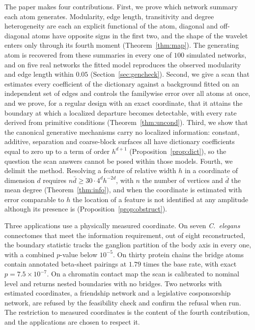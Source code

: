 \documentclass[11pt]{article}
\theoremstyle{definition}
\newcommand{\1}{\mathbf 1}\newcommand{\op}{\operatorname}
\begin{document}
The paper makes four contributions.  First, we prove which network summary
each atom generates.  Modularity, edge length, transitivity and degree
heterogeneity are each an explicit functional of the atom, diagonal and
off-diagonal atoms have opposite signs in the first two, and the shape of the
wavelet enters only through its fourth moment (Theorem~\ref{thm:map}).  The
generating atom is recovered from these summaries in every one of $100$
simulated networks, and on five real networks the fitted model reproduces
the observed modularity and edge length within $0.05$
(Section~\ref{sec:gencheck}).  Second, we give a scan that estimates every coefficient
of the dictionary against a background fitted on an independent set of edges
and controls the familywise error over all atoms at once, and we prove, for a
regular design with an exact coordinate, that it attains the boundary at which
a localized departure becomes detectable, with every rate derived from
primitive conditions (Theorem~\ref{thm:uncond}).  Third, we show that the
canonical generative mechanisms carry no localized information: constant,
additive, separation and coarse-block surfaces all have dictionary
coefficients equal to zero up to a term of order $h^{d+1}$
(Proposition~\ref{prop:dict}), so the question the scan answers cannot be
posed within those models.  Fourth, we delimit the method.  Resolving a
feature of relative width $h$ in a coordinate of dimension $d$ requires
$n\bar d\ge30\cdot4^{d}h^{-2d}$, with $n$ the number of vertices and $\bar d$
the mean degree (Theorem~\ref{thm:info}), and when the
coordinate is estimated with error comparable to $h$ the location of a feature
is not identified at any amplitude although its presence is
(Proposition~\ref{prop:obstruct}).

Three applications use a physically measured coordinate.  On seven
\emph{C.~elegans} connectomes that meet the information requirement, out of
eight reconstructed, the boundary statistic tracks the ganglion partition of
the body axis in every one, with a combined $p$-value below $10^{-5}$.  On thirty protein chains the bridge atoms contain annotated beta-sheet
pairings at $1.79$ times the base rate, with exact $p=7.5\times10^{-7}$.  On a chromatin contact map
the scan is calibrated to nominal level and returns nested boundaries with no
bridges.  Two networks with estimated coordinates, a friendship network and a
legislative cosponsorship network, are refused by the feasibility check and
confirm the refusal when run.  The restriction to measured coordinates is the
content of the fourth contribution, and the applications are chosen to
respect it.
\end{document}

